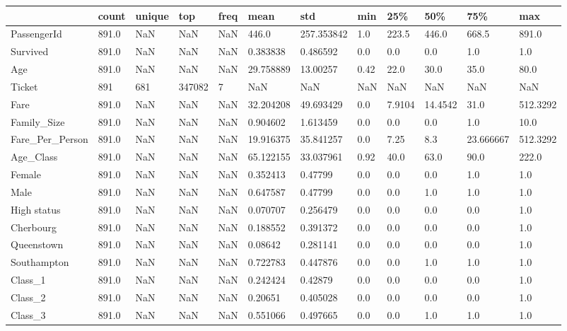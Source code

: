 \begin{tabular}{llllllllllll}
\toprule
{} &  count & unique &     top & freq &       mean &         std &   min &     25\% &      50\% &        75\% &       max \\
\midrule
PassengerId     &  891.0 &    NaN &     NaN &  NaN &      446.0 &  257.353842 &   1.0 &   223.5 &    446.0 &      668.5 &     891.0 \\
Survived        &  891.0 &    NaN &     NaN &  NaN &   0.383838 &    0.486592 &   0.0 &     0.0 &      0.0 &        1.0 &       1.0 \\
Age             &  891.0 &    NaN &     NaN &  NaN &  29.758889 &    13.00257 &  0.42 &    22.0 &     30.0 &       35.0 &      80.0 \\
Ticket          &    891 &    681 &  347082 &    7 &        NaN &         NaN &   NaN &     NaN &      NaN &        NaN &       NaN \\
Fare            &  891.0 &    NaN &     NaN &  NaN &  32.204208 &   49.693429 &   0.0 &  7.9104 &  14.4542 &       31.0 &  512.3292 \\
Family\_Size     &  891.0 &    NaN &     NaN &  NaN &   0.904602 &    1.613459 &   0.0 &     0.0 &      0.0 &        1.0 &      10.0 \\
Fare\_Per\_Person &  891.0 &    NaN &     NaN &  NaN &  19.916375 &   35.841257 &   0.0 &    7.25 &      8.3 &  23.666667 &  512.3292 \\
Age\_Class       &  891.0 &    NaN &     NaN &  NaN &  65.122155 &   33.037961 &  0.92 &    40.0 &     63.0 &       90.0 &     222.0 \\
Female          &  891.0 &    NaN &     NaN &  NaN &   0.352413 &     0.47799 &   0.0 &     0.0 &      0.0 &        1.0 &       1.0 \\
Male            &  891.0 &    NaN &     NaN &  NaN &   0.647587 &     0.47799 &   0.0 &     0.0 &      1.0 &        1.0 &       1.0 \\
High status     &  891.0 &    NaN &     NaN &  NaN &   0.070707 &    0.256479 &   0.0 &     0.0 &      0.0 &        0.0 &       1.0 \\
Cherbourg       &  891.0 &    NaN &     NaN &  NaN &   0.188552 &    0.391372 &   0.0 &     0.0 &      0.0 &        0.0 &       1.0 \\
Queenstown      &  891.0 &    NaN &     NaN &  NaN &    0.08642 &    0.281141 &   0.0 &     0.0 &      0.0 &        0.0 &       1.0 \\
Southampton     &  891.0 &    NaN &     NaN &  NaN &   0.722783 &    0.447876 &   0.0 &     0.0 &      1.0 &        1.0 &       1.0 \\
Class\_1         &  891.0 &    NaN &     NaN &  NaN &   0.242424 &     0.42879 &   0.0 &     0.0 &      0.0 &        0.0 &       1.0 \\
Class\_2         &  891.0 &    NaN &     NaN &  NaN &    0.20651 &    0.405028 &   0.0 &     0.0 &      0.0 &        0.0 &       1.0 \\
Class\_3         &  891.0 &    NaN &     NaN &  NaN &   0.551066 &    0.497665 &   0.0 &     0.0 &      1.0 &        1.0 &       1.0 \\
\bottomrule
\end{tabular}
